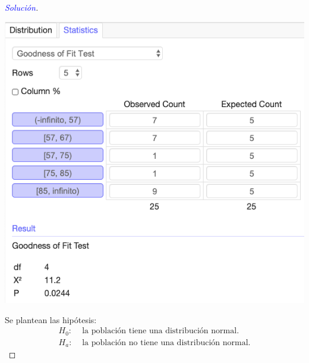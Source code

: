 \documentclass[a4paper,12pt]{article}
\newenvironment{solution}
  {\renewcommand\qedsymbol{$\square$}\begin{proof}[\textcolor{blue}{Solución}]}
  {\end{proof}}
\begin{document}
\begin{solution}
\begin{center}
    \includegraphics[scale=0.4]{images/Screen Shot 2021-05-11 at 15.05.35.png}
\end{center}
Se plantean las hipótesis: 
\begin{align*}
    H_0: & \text{ la población tiene una distribución normal.}\\ 
    H_a: & \text{  la población no tiene una distribución normal.}
\end{align*}


\end{solution}
\end{document}
